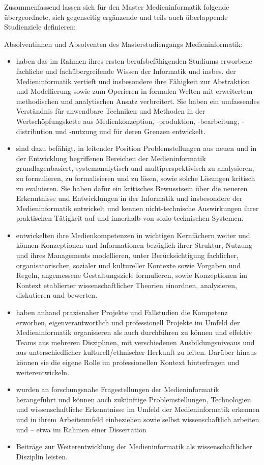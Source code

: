Zusammenfassend lassen sich für den Master Medieninformatik folgende
übergeordnete, sich gegenseitig ergänzende und teils auch überlappende
Studienziele definieren:

Absolventinnen und Absolventen des Masterstudiengangs Medieninformatik:

\begin{itemize}
\item
  haben das im Rahmen ihres ersten berufsbefähigenden Studiums erworbene
  fachliche und fachübergreifende Wissen der Informatik und insbes. der
  Medieninformatik vertieft und insbesondere ihre Fähigkeit zur
  Abstraktion und Modellierung sowie zum Operieren in formalen Welten
  mit erweitertem methodischen und analytischen Ansatz verbreitert. Sie
  haben ein umfassendes Verständnis für anwendbare Techniken und
  Methoden in der Wertschöpfungskette aus Medienkonzeption, -produktion,
  -bearbeitung, -distribution und -nutzung und für deren Grenzen
  entwickelt.
\item
  sind dazu befähigt, in leitender Position Problemstellungen aus neuen
  und in der Entwicklung begriffenen Bereichen der Medieninformatik
  grundlagenbasiert, systemanalytisch und multiperspektivisch zu
  analysieren, zu formulieren, zu formalisieren und zu lösen, sowie
  solche Lösungen kritisch zu evaluieren. Sie haben dafür ein kritisches
  Bewusstsein über die neueren Erkenntnisse und Entwicklungen in der
  Informatik und insbesondere der Medieninformatik entwickelt und kennen
  nicht-technische Auswirkungen ihrer praktischen Tätigkeit auf und
  innerhalb von sozio-technischen Systemen.
\item
  entwickelten ihre Medienkompetenzen in wichtigen Kernfächern weiter
  und können Konzeptionen und Informationen bezüglich ihrer Struktur,
  Nutzung und ihres Managements modellieren, unter Berücksichtigung
  fachlicher, organisatorischer, sozialer und kultureller Kontexte sowie
  Vorgaben und Regeln, angemessene Gestaltungsziele formulieren, sowie
  Konzeptionen im Kontext etablierter wissenschaftlicher Theorien
  einordnen, analysieren, diskutieren und bewerten.
\item
  haben anhand praxisnaher Projekte und Fallstudien die Kompetenz
  erworben, eigenverantwortlich und professionell Projekte im Umfeld der
  Medieninformatik organisieren als auch durchführen zu können und
  effektiv Teams aus mehreren Disziplinen, mit verschiedenen
  Ausbildungsniveaus und aus unterschiedlicher kulturell/ethnischer
  Herkunft zu leiten. Darüber hinaus können sie die eigene Rolle im
  professionellen Kontext hinterfragen und weiterentwickeln.
\item
  wurden an forschungsnahe Fragestellungen der Medieninformatik
  herangeführt und können auch zukünftige Problemstellungen,
  Technologien und wissenschaftliche Erkenntnisse im Umfeld der
  Medieninformatik erkennen und in ihrem Arbeitsumfeld einbeziehen sowie
  selbst wissenschaftlich arbeiten und -- etwa im Rahmen einer
  Dissertation
\item
  Beiträge zur Weiterentwicklung der Medieninformatik als
  wissenschaftlicher Disziplin leisten.
\end{itemize}

